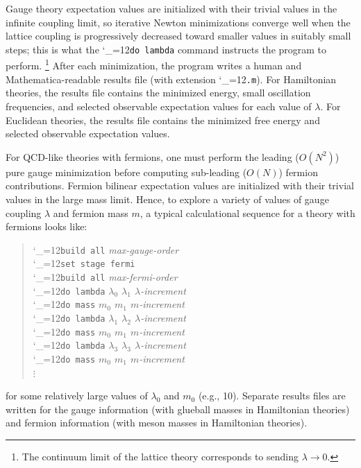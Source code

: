 \documentclass [12pt]{article}
\makeatletter
\renewcommand{\tt}{\begingroup\catcode`_=12\def\_{\string_}\tt@}
\newcommand{\tt@}[1]{\texttt{#1}\endgroup}
\makeatother
\begin{document}
Gauge theory expectation values are initialized with their trivial values in the
infinite coupling limit,
so iterative Newton minimizations converge well when the lattice coupling
is progressively decreased toward smaller values in suitably small steps;
this is what the \tt{do~lambda} command instructs the program to perform.%
\footnote
    {
    The continuum limit of the lattice theory corresponds to sending $\lambda \to 0$.
    }
After each minimization, the program writes a
human and Mathematica-readable results file (with extension \tt{.m}).
For Hamiltonian theories, the results file contains
the minimized energy, small oscillation frequencies, and selected
observable expectation values for each value of $\lambda$. 
For Euclidean theories, the results file contains
the minimized free energy and selected observable expectation values.

For QCD-like theories with fermions, one must perform the leading ($O(N^2)$) pure gauge
minimization before computing sub-leading ($O(N)$) fermion contributions.
Fermion bilinear expectation values are initialized with their trivial values in the
large mass limit.
Hence, to explore a variety of values of gauge coupling $\lambda$ and fermion mass $m$,
a typical calculational sequence for a theory with fermions looks like:
\begin{quote}
  \tt{build all} \textit{max-gauge-order}
\\\tt{set stage fermi}
\\\tt{build all} \textit{max-fermi-order}
\\\tt{do lambda} \textit{$\lambda_0$ $\lambda_1$ $\lambda$-increment}
\\\tt{do mass} \textit{$m_0$ $m_1$ $m$-increment}
\\\tt{do lambda} \textit{$\lambda_1$ $\lambda_2$ $\lambda$-increment}
\\\tt{do mass} \textit{$m_0$ $m_1$ $m$-increment}
\\\tt{do lambda} \textit{$\lambda_3$ $\lambda_3$ $\lambda$-increment}
\\\tt{do mass} \textit{$m_0$ $m_1$ $m$-increment}
\\\hspace*{0.8cm} $\vdots$
\end{quote}
for some relatively large values of $\lambda_0$ and $m_0$ (e.g., 10).
Separate results files are written for the gauge information
(with glueball masses in Hamiltonian theories)
and fermion information
(with meson masses in Hamiltonian theories).
\end{document}
